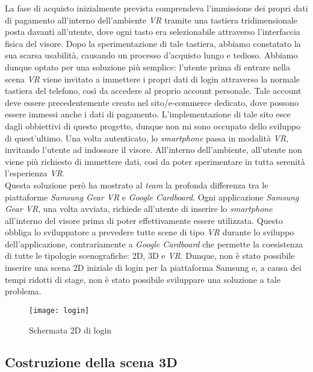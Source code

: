 La fase di acquisto inizialmente prevista comprendeva l'immissione dei propri dati di pagamento all'interno dell'ambiente \textit{VR} tramite una tastiera tridimensionale posta davanti all'utente, dove ogni tasto era selezionabile attraverso l'interfaccia fisica del visore. Dopo la sperimentazione di tale tastiera, abbiamo constatato la sua scarsa usabilità, causando un processo d'acquisto lungo e tedioso. Abbiamo dunque optato per una soluzione più semplice: l'utente prima di entrare nella scena \textit{VR} viene invitato a immettere i propri dati di login attraverso la normale tastiera del telefono, così da accedere al proprio account personale. Tale account deve essere precedentemente creato nel sito/e-commerce dedicato, dove possono essere immessi anche i dati di pagamento. L'implementazione di tale sito esce dagli obbiettivi di questo progetto, dunque non mi sono occupato dello sviluppo di quest'ultimo. Una volta autenticato, lo \textit{smartphone} passa in modalità \textit{VR}, invitando l'utente ad indossare il visore. All'interno dell'ambiente, all'utente non viene più richiesto di immettere dati, così da poter sperimentare in tutta serenità l'esperienza \textit{VR}. \\
Questa soluzione però ha mostrato al \textit{team} la profonda differenza tra le piattaforme \textit{Samsung Gear VR} e \textit{Google Cardboard}. Ogni applicazione \textit{Samsung Gear VR}, una volta avviata, richiede all'utente di inserire lo \textit{smartphone} all'interno del visore prima di poter effettivamente essere utilizzata. Questo obbliga lo sviluppatore a prevedere tutte scene di tipo \textit{VR} durante lo sviluppo dell'applicazione, contrariamente a \textit{Google Cardboard} che permette la coesistenza di tutte le tipologie scenografiche: 2D, 3D e \textit{VR}. Dunque, non è stato possibile inserire una scena 2D iniziale di login per la piattaforma Samsung e, a causa dei tempi ridotti di stage, non è stato possibile sviluppare una soluzione a tale problema.

\label{Login}
\begin{figure}[ht]
	\begin{center}
		\texttt{[image: login]}
		\caption{Schermata 2D di login}
	\end{center}
\end{figure}
\FloatBarrier

\subsection{Costruzione della scena 3D}

